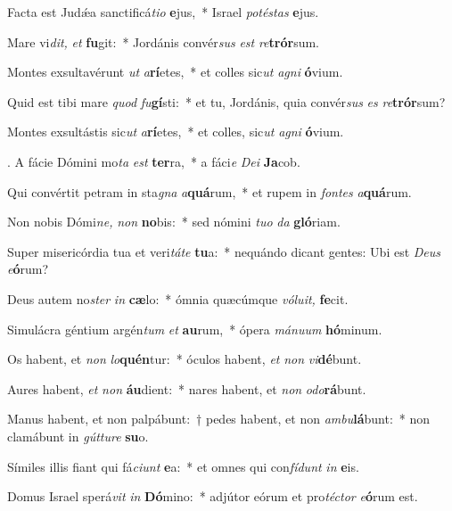 \item Facta est Judǽa sanctificá\textit{tio} \textbf{e}jus,~* Israel \textit{potéstas} \textbf{e}jus.
\item Mare vi\textit{dit,} \textit{et} \textbf{fu}git:~* Jordánis convér\textit{sus} \textit{est} \textit{re}\textbf{trór}sum.
\item Montes exsultavérunt \textit{ut} \textit{a}\textbf{rí}etes,~* et colles sic\textit{ut} \textit{agni} \textbf{ó}vium.
\item Quid est tibi mare \textit{quod} \textit{fu}\textbf{gí}sti:~* et tu, Jordánis, quia convér\textit{sus} \textit{es} \textit{re}\textbf{trór}sum?
\item Montes exsultástis sic\textit{ut} \textit{a}\textbf{rí}etes,~* et colles, sic\textit{ut} \textit{agni} \textbf{ó}vium.
\item. A fácie Dómini mo\textit{ta} \textit{est} \textbf{ter}ra,~* a fáci\textit{e} \textit{Dei} \textbf{Ja}cob.
\item Qui convértit petram in sta\textit{gna} \textit{a}\textbf{quá}rum,~* et rupem in \textit{fontes} \textit{a}\textbf{quá}rum.
\item Non nobis Dómi\textit{ne,} \textit{non} \textbf{no}bis:~* sed nómini \textit{tuo} \textit{da} \textbf{gló}riam.
\item Super misericórdia tua et veri\textit{táte} \textbf{tu}a:~* nequándo dicant gentes: Ubi est \textit{Deus} \textit{e}\textbf{ó}rum?
\item Deus autem no\textit{ster} \textit{in} \textbf{cæ}lo:~* ómnia quæcúmque \textit{vóluit,} \textbf{fe}cit.
\item Simulácra géntium argén\textit{tum} \textit{et} \textbf{au}rum,~* ópera \textit{mánuum} \textbf{hó}minum.
\item Os habent, et \textit{non} \textit{lo}\textbf{quén}tur:~* óculos habent, \textit{et} \textit{non} \textit{vi}\textbf{dé}bunt.
\item Aures habent, \textit{et} \textit{non} \textbf{áu}dient:~* nares habent, et \textit{non} \textit{odo}\textbf{rá}bunt.
\item Manus habent, et non palpábunt:~† pedes habent, et non \textit{ambu}\textbf{lá}bunt:~* non clamábunt in \textit{gútture} \textbf{su}o.
\item Símiles illis fiant qui fá\textit{ciunt} \textbf{e}a:~* et omnes qui con\textit{fídunt} \textit{in} \textbf{e}is.
\item Domus Israel sperá\textit{vit} \textit{in} \textbf{Dó}mino:~* adjútor eórum et pro\textit{téctor} \textit{e}\textbf{ó}rum est.
